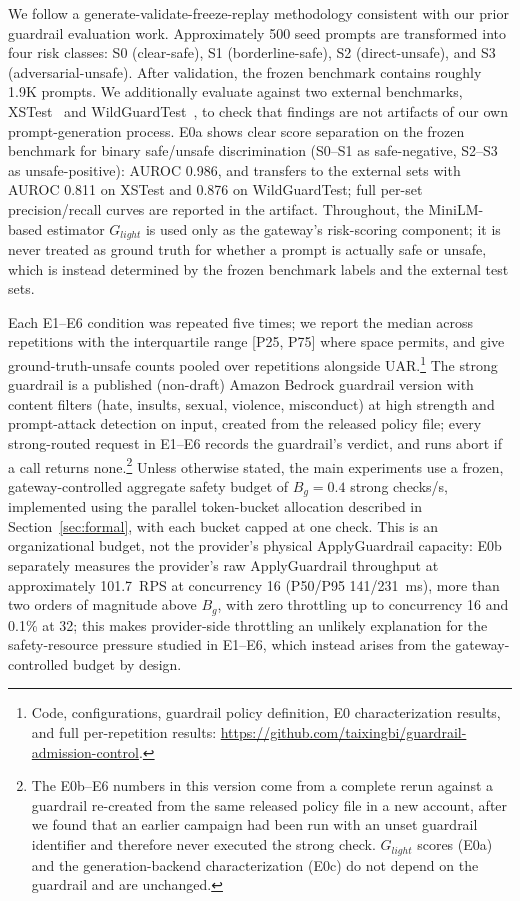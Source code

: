 \documentclass[conference]{IEEEtran}
\newcommand{\Glight}{G_{\mathit{light}}}
\newcommand{\Bg}{B_g}
\begin{document}
We follow a generate-validate-freeze-replay methodology consistent with our prior guardrail evaluation work. Approximately 500 seed prompts are transformed into four risk classes: S0 (clear-safe), S1 (borderline-safe), S2 (direct-unsafe), and S3 (adversarial-unsafe). After validation, the frozen benchmark contains roughly 1.9K prompts. We additionally evaluate against two external benchmarks, XSTest~\cite{rottger2024xstest} and WildGuardTest~\cite{han2024wildguard}, to check that findings are not artifacts of our own prompt-generation process. E0a shows clear score separation on the frozen benchmark for binary safe/unsafe discrimination (S0--S1 as safe-negative, S2--S3 as unsafe-positive): AUROC 0.986, and transfers to the external sets with AUROC 0.811 on XSTest and 0.876 on WildGuardTest; full per-set precision/recall curves are reported in the artifact. Throughout, the MiniLM-based estimator $\Glight$ is used only as the gateway's risk-scoring component; it is never treated as ground truth for whether a prompt is actually safe or unsafe, which is instead determined by the frozen benchmark labels and the external test sets.

Each E1--E6 condition was repeated five times; we report the median across repetitions with the interquartile range [P25, P75] where space permits, and give ground-truth-unsafe counts pooled over repetitions alongside UAR.\footnote{Code, configurations, guardrail policy definition, E0 characterization results, and full per-repetition results: \url{https://github.com/taixingbi/guardrail-admission-control}.} The strong guardrail is a published (non-draft) Amazon Bedrock guardrail version with content filters (hate, insults, sexual, violence, misconduct) at high strength and prompt-attack detection on input, created from the released policy file; every strong-routed request in E1--E6 records the guardrail's verdict, and runs abort if a call returns none.\footnote{The E0b--E6 numbers in this version come from a complete rerun against a guardrail re-created from the same released policy file in a new account, after we found that an earlier campaign had been run with an unset guardrail identifier and therefore never executed the strong check. $\Glight$ scores (E0a) and the generation-backend characterization (E0c) do not depend on the guardrail and are unchanged.} Unless otherwise stated, the main experiments use a frozen, gateway-controlled aggregate safety budget of $\Bg = 0.4$ strong checks/s, implemented using the parallel token-bucket allocation described in Section~\ref{sec:formal}, with each bucket capped at one check. This is an organizational budget, not the provider's physical ApplyGuardrail capacity: E0b separately measures the provider's raw ApplyGuardrail throughput at approximately 101.7~RPS at concurrency 16 (P50/P95 141/231~ms), more than two orders of magnitude above $\Bg$, with zero throttling up to concurrency 16 and 0.1\% at 32; this makes provider-side throttling an unlikely explanation for the safety-resource pressure studied in E1--E6, which instead arises from the gateway-controlled budget by design.
\end{document}
